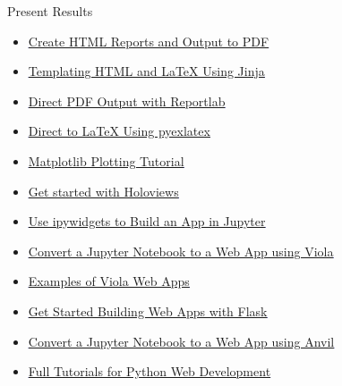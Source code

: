 \documentclass[handout, 11pt]{beamer}
\begin{document}
\begin{section}{Present Results}
\begin{frame}
\begin{itemize}
\vfill
\item \textcolor{blue}{\underline{\href{https://towardsdatascience.com/creating-pdf-reports-with-python-pdfkit-and-jinja2-templates-64a89158fa2d}{Create HTML Reports and Output to PDF}}}
\vfill
\item \textcolor{blue}{\underline{\href{https://realpython.com/primer-on-jinja-templating/}{Templating HTML and LaTeX Using Jinja}}}
\vfill
\item \textcolor{blue}{\underline{\href{https://www.reportlab.com/docs/reportlab-userguide.pdf}{Direct PDF Output with Reportlab}}}
\vfill
\item \textcolor{blue}{\underline{\href{https://nickderobertis.github.io/py-ex-latex/}{Direct to LaTeX Using pyexlatex}}}
\vfill
\item \textcolor{blue}{\underline{\href{https://www.datacamp.com/community/tutorials/matplotlib-tutorial-python}{Matplotlib Plotting Tutorial}}}
\vfill
\item \textcolor{blue}{\underline{\href{https://holoviews.org/getting\_started/index.html}{Get started with Holoviews}}}
\vfill
\item \textcolor{blue}{\underline{\href{https://towardsdatascience.com/bring-your-jupyter-notebook-to-life-with-interactive-widgets-bc12e03f0916}{Use ipywidgets to Build an App in Jupyter}}}
\vfill
\item \textcolor{blue}{\underline{\href{https://voila.readthedocs.io/en/stable/}{Convert a Jupyter Notebook to a Web App using Viola}}}
\vfill
\item \textcolor{blue}{\underline{\href{https://voila-gallery.org/services/gallery/}{Examples of Viola Web Apps}}}
\vfill
\item \textcolor{blue}{\underline{\href{https://scotch.io/tutorials/getting-started-with-flask-a-python-microframework}{Get Started Building Web Apps with Flask}}}
\vfill
\item \textcolor{blue}{\underline{\href{https://anvil.works/learn/tutorials/jupyter-notebook-to-web-app}{Convert a Jupyter Notebook to a Web App using Anvil}}}
\vfill
\item \textcolor{blue}{\underline{\href{https://www.fullstackpython.com/}{Full Tutorials for Python Web Development}}}
\end{itemize}
\end{frame}
\end{section}
\end{document}
